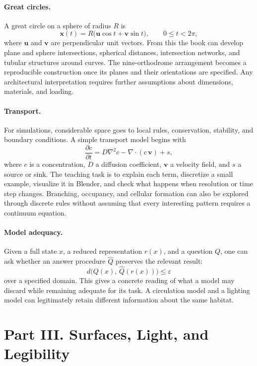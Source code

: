 \documentclass[11pt,openany]{book}
\begin{document}
\paragraph{Great circles.} A great circle on a sphere of radius $R$ is
\[
  \mathbf{x}(t) = R\bigl(\mathbf{u}\cos t + \mathbf{v}\sin t\bigr),
  \qquad 0 \le t < 2\pi,
\]
where $\mathbf{u}$ and $\mathbf{v}$ are perpendicular unit vectors. From this the book can develop plane and sphere intersections, spherical distances, intersection networks, and tubular structures around curves. The nine-orthodrome arrangement becomes a reproducible construction once its planes and their orientations are specified. Any architectural interpretation requires further assumptions about dimensions, materials, and loading.

\paragraph{Transport.} For simulations, considerable space goes to local rules, conservation, stability, and boundary conditions. A simple transport model begins with
\[
  \frac{\partial c}{\partial t}
  = D\nabla^{2}c - \nabla\!\cdot(c\,\mathbf{v}) + s,
\]
where $c$ is a concentration, $D$ a diffusion coefficient, $\mathbf{v}$ a velocity field, and $s$ a source or sink. The teaching task is to explain each term, discretize a small example, visualize it in Blender, and check what happens when resolution or time step changes. Branching, occupancy, and cellular formation can also be explored through discrete rules without assuming that every interesting pattern requires a continuum equation.

\paragraph{Model adequacy.} Given a full state $x$, a reduced representation $r(x)$, and a question $Q$, one can ask whether an answer procedure $\widehat{Q}$ preserves the relevant result:
\[
  d\bigl(Q(x),\,\widehat{Q}(r(x))\bigr) \le \varepsilon
\]
over a specified domain. This gives a concrete reading of what a model may discard while remaining adequate for its task. A circulation model and a lighting model can legitimately retain different information about the same habitat.

\section*{Part III. Surfaces, Light, and Legibility}
\end{document}
